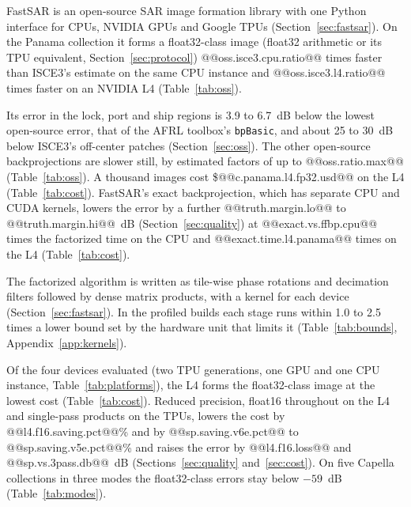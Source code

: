 \documentclass[11pt]{article}
\begin{document}
FastSAR is an open-source SAR image formation library with one Python interface for CPUs, NVIDIA GPUs and Google TPUs (Section~\ref{sec:fastsar}). On the Panama collection it forms a float32-class image (float32 arithmetic or its TPU equivalent, Section~\ref{sec:protocol}) @@oss.isce3.cpu.ratio@@ times faster than ISCE3's estimate on the same CPU instance and @@oss.isce3.l4.ratio@@ times faster on an NVIDIA L4 (Table~\ref{tab:oss}).

Its error in the lock, port and ship regions is 3.9 to 6.7~dB below the lowest open-source error, that of the AFRL toolbox's \texttt{bpBasic}, and about 25 to 30~dB below ISCE3's off-center patches (Section~\ref{sec:oss}). The other open-source backprojections are slower still, by estimated factors of up to @@oss.ratio.max@@ (Table~\ref{tab:oss}). A thousand images cost \$@@c.panama.l4.fp32.usd@@ on the L4 (Table~\ref{tab:cost}). FastSAR's exact backprojection, which has separate CPU and CUDA kernels, lowers the error by a further @@truth.margin.lo@@ to @@truth.margin.hi@@~dB (Section~\ref{sec:quality}) at @@exact.vs.ffbp.cpu@@ times the factorized time on the CPU and @@exact.time.l4.panama@@ times on the L4 (Table~\ref{tab:cost}).

The factorized algorithm is written as tile-wise phase rotations and decimation filters followed by dense matrix products, with a kernel for each device (Section~\ref{sec:fastsar}). In the profiled builds each stage runs within 1.0 to 2.5 times a lower bound set by the hardware unit that limits it (Table~\ref{tab:bounds}, Appendix~\ref{app:kernels}).

Of the four devices evaluated (two TPU generations, one GPU and one CPU instance, Table~\ref{tab:platforms}), the L4 forms the float32-class image at the lowest cost (Table~\ref{tab:cost}). Reduced precision, float16 throughout on the L4 and single-pass products on the TPUs, lowers the cost by @@l4.f16.saving.pct@@\% and by @@sp.saving.v6e.pct@@ to @@sp.saving.v5e.pct@@\% and raises the error by @@l4.f16.loss@@ and @@sp.vs.3pass.db@@~dB (Sections~\ref{sec:quality} and~\ref{sec:cost}). On five Capella collections in three modes the float32-class errors stay below $-59$~dB (Table~\ref{tab:modes}).
\end{document}
